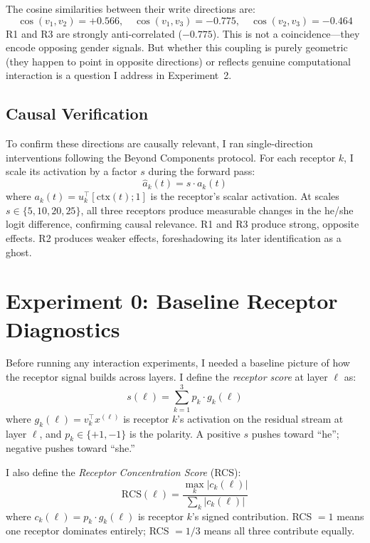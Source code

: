 \documentclass[11pt,a4paper]{article}
\begin{document}
The cosine similarities between their write directions are:
\begin{equation}
\cos(v_1, v_2) = +0.566, \quad \cos(v_1, v_3) = -0.775, \quad \cos(v_2, v_3) = -0.464
\end{equation}
R1 and R3 are strongly anti-correlated ($-0.775$). This is not a coincidence---they encode opposing gender signals. But whether this coupling is purely geometric (they happen to point in opposite directions) or reflects genuine computational interaction is a question I address in Experiment~2.

\subsection{Causal Verification}

To confirm these directions are causally relevant, I ran single-direction interventions following the Beyond Components protocol. For each receptor $k$, I scale its activation by a factor $s$ during the forward pass:
\begin{equation}
\hat{a}_k(t) = s \cdot a_k(t)
\end{equation}
where $a_k(t) = u_k^\top [\text{ctx}(t); 1]$ is the receptor's scalar activation. At scales $s \in \{5, 10, 20, 25\}$, all three receptors produce measurable changes in the he/she logit difference, confirming causal relevance. R1 and R3 produce strong, opposite effects. R2 produces weaker effects, foreshadowing its later identification as a ghost.


\section{Experiment 0: Baseline Receptor Diagnostics}
\label{sec:exp0}

Before running any interaction experiments, I needed a baseline picture of how the receptor signal builds across layers. I define the \emph{receptor score} at layer $\ell$ as:
\begin{equation}
s(\ell) = \sum_{k=1}^{3} p_k \cdot g_k(\ell)
\end{equation}
where $g_k(\ell) = v_k^\top x^{(\ell)}$ is receptor $k$'s activation on the residual stream at layer $\ell$, and $p_k \in \{+1, -1\}$ is the polarity. A positive $s$ pushes toward ``he''; negative pushes toward ``she.''

I also define the \emph{Receptor Concentration Score} (RCS):
\begin{equation}
\text{RCS}(\ell) = \frac{\max_k |c_k(\ell)|}{\sum_k |c_k(\ell)|}
\end{equation}
where $c_k(\ell) = p_k \cdot g_k(\ell)$ is receptor $k$'s signed contribution. RCS $= 1$ means one receptor dominates entirely; RCS $= 1/3$ means all three contribute equally.
\end{document}
